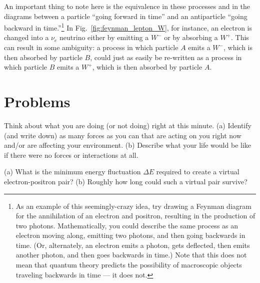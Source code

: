 
An important thing to note here is the equivalence in these
processes and in the diagrams between a particle ``going forward
in time'' and an antiparticle ``going backward in
time.''\footnote{As an example of this seemingly-crazy idea, try
drawing a Feynman diagram for the annihilation of an electron and
positron, resulting in the production of two photons.
Mathematically, you could describe the same process as an electron
moving along, emitting two photons, and then going backwards in
time.  (Or, alternately, an electron emits a photon, gets
deflected, then emits another photon, and then goes backwards in
time.)
Note that this does not mean that quantum theory predicts the
possibility of macroscopic objects traveling backwards in time ---
it does not.} In Fig.~\ref{fig:feynman_lepton_W}, for instance, an
electron is changed into a $\nu_e$ neutrino either by emitting a
$W^-$ or by absorbing a $W^+$.  This can result in some ambiguity:
a process in which particle $A$ emits a $W^-$, which is then
absorbed by particle $B$, could just as easily be re-written as a
process in which particle $B$ emits a $W^+$, which is then
absorbed by particle $A$.

\newpage

\section*{Problems}
\label{sec:quarks_problems}

\begin{problem}
Think about what you are doing (or not doing) right at this
minute. (a) Identify (and write down) as many forces as you can
that are acting on you right now and/or are affecting your
environment. (b) Describe what your life would be like if there
were no forces or interactions at all. 
\label{prob:think_about_forces}
\end{problem}

\begin{problem}
(a) What is the minimum energy fluctuation $\Delta E$
required  to create a virtual electron-positron pair?  
(b) Roughly how long could such a virtual pair survive?
\label{prob:pair_production}
\end{problem}

